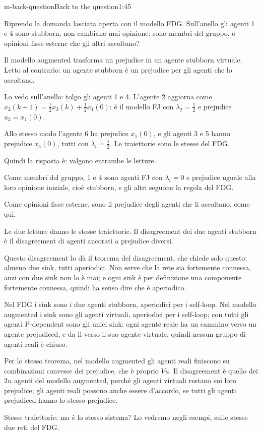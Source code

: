 \begin{slidedue}{m-back-question}{Back to the question}{1:45}
  \begin{discorso}
    \item Riprendo la domanda lasciata aperta con il modello FDG. Sull'anello gli agenti 1 e 4 sono stubborn, non cambiano mai opinione: sono membri del gruppo, o opinioni fisse esterne che gli altri ascoltano?
    \item Il modello augmented trasforma un prejudice in un agente stubborn virtuale. Letto al contrario: un agente stubborn è un prejudice per gli agenti che lo ascoltano.
    \item Lo vedo sull'anello: tolgo gli agenti 1 e 4. L'agente 2 aggiorna come $x_2(k+1)=\tfrac12x_3(k)+\tfrac12x_1(0)$: è il modello FJ con $\lambda_2=\tfrac12$ e prejudice $u_2=x_1(0)$.
    \item Allo stesso modo l'agente 6 ha prejudice $x_1(0)$, e gli agenti 3 e 5 hanno prejudice $x_4(0)$, tutti con $\lambda_i=\tfrac12$. Le traiettorie sono le stesse del FDG.
    \item \clic Quindi la risposta è: valgono entrambe le letture.
    \item Come membri del gruppo, 1 e 4 sono agenti FJ con $\lambda_i=0$ e prejudice uguale alla loro opinione iniziale, cioè stubborn, e gli altri seguono la regola del FDG.
    \item Come opinioni fisse esterne, sono il prejudice degli agenti che li ascoltano, come qui.
    \item Le due letture danno le stesse traiettorie. Il disagreement dei due agenti stubborn è il disagreement di agenti ancorati a prejudice diversi.
    \item Questo disagreement lo dà il teorema del disagreement, che chiede solo questo: almeno due sink, tutti aperiodici. Non serve che la rete sia fortemente connessa, anzi con due sink non lo è mai; e ogni sink è per definizione una componente fortemente connessa, quindi ha senso dire che è aperiodico.
    \item Nel FDG i sink sono i due agenti stubborn, aperiodici per i self-loop. Nel modello augmented i sink sono gli agenti virtuali, aperiodici per i self-loop; con tutti gli agenti P-dependent sono gli unici sink: ogni agente reale ha un cammino verso un agente prejudiced, e da lì verso il suo agente virtuale, quindi nessun gruppo di agenti reali è chiuso.
    \item Per lo stesso teorema, nel modello augmented gli agenti reali finiscono su combinazioni convesse dei prejudice, che è proprio $Vu$. Il disagreement è quello dei $2n$ agenti del modello augmented, perché gli agenti virtuali restano sui loro prejudice; gli agenti reali possono anche essere d'accordo, se tutti gli agenti prejudiced hanno lo stesso prejudice.
    \item Stesse traiettorie: ma è lo stesso sistema? Lo vedremo negli esempi, sulle stesse due reti del FDG.
  \end{discorso}
\end{slidedue}


